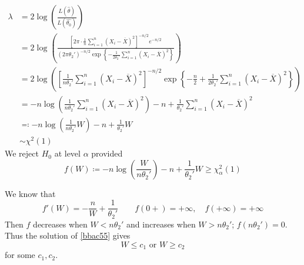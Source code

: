 \[
\begin{aligned}
\lambda & =2\log\left( \frac{L(\widehat{\theta})}{L(\widehat{\theta_0})} \right) \\
 & =2\log\left( \frac{\left[ 2\pi \cdot\frac{1}{n}\sum_{i=1}^{n} (X_i-\overline{X})^2 \right]^{-n/2 }e^{ -n/2  }}{(2\pi\theta_2')^{-n/2 }\exp \left\{  -\frac{1}{2\theta_2'}\sum_{i=1}^{n} (X_i-\overline{X})^2  \right\}} \right) \\
 & =2\log\left( \left[ \frac{1}{n\theta_2'}\sum_{i=1}^{n} (X_i-\overline{X})^2 \right]^{-n/2 }\exp \left\{  -\frac{n}{2}+\frac{1}{2\theta_2'}\sum_{i=1}^{n} (X_i-\overline{X})^2  \right\} \right) \\
 & =-n\log\left( \frac{1}{n\theta_2'} \sum_{i=1}^{n} (X_i-\overline{X})^2 \right)-n+\frac{1}{\theta_2'}\sum_{i=1}^{n} (X_i-\overline{X})^2 \\
 & \eqqcolon -n\log\left( \frac{1}{n\theta_2'}W \right)-n+\frac{1}{\theta_2'}W \\
 & \sim \chi^{2}(1)
\end{aligned}
\]
We reject $H_0$ at level $\alpha$ provided
\begin{equation}
f(W)\coloneqq -n\log\left( \frac{W}{n\theta_2'} \right)-n+\frac{1}{\theta_2'}W\geq \chi^{2}_{\alpha}(1)
\label{bbac55}
\end{equation}

We know that
\[
f'(W)=-\frac{n}{W}+\frac{1}{\theta_2'}\qquad f(0+)=+\infty,\quad f(+\infty)=+\infty
\]
Then $f$ decreases when $W<n\theta_2'$ and increases when $W>n\theta_2'$; $f(n\theta_2')=0$. Thus the solution of \cref{bbac55} gives
\[
W\leq c_1\text{ or }W\geq c_2
\]
for some $c_1,c_2$.

